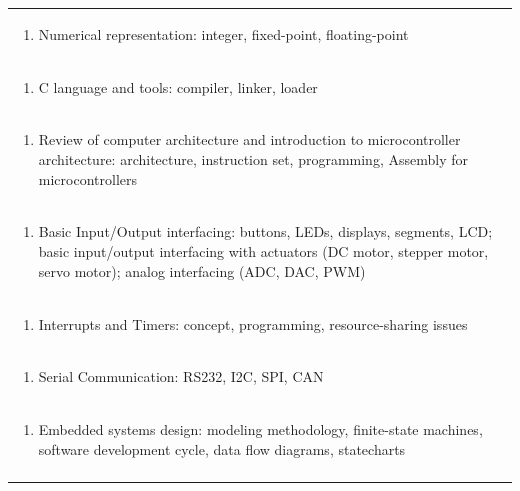 \documentclass[11pt]{article}
\begin{document}
\begin{center}
\begin{longtable}{|p{4cm}|p{4cm}|p{4cm}|p{4cm}|}
\multicolumn{4}{|p{\dimexpr 16cm + 6\tabcolsep\relax}|}{\begin{enumerate}[start=2]\item Numerical representation: integer, fixed-point, floating-point\end{enumerate}}\\
\multicolumn{4}{|p{\dimexpr 16cm + 6\tabcolsep\relax}|}{\begin{enumerate}[start=3]\item C language and tools: compiler, linker, loader\end{enumerate}}\\
\multicolumn{4}{|p{\dimexpr 16cm + 6\tabcolsep\relax}|}{\begin{enumerate}[start=4]\item Review of computer architecture and introduction to microcontroller architecture: architecture, instruction set, programming, Assembly for microcontrollers\end{enumerate}}\\
\multicolumn{4}{|p{\dimexpr 16cm + 6\tabcolsep\relax}|}{\begin{enumerate}[start=5]\item Basic Input/Output interfacing: buttons, LEDs, displays, segments, LCD; basic input/output interfacing with actuators (DC motor, stepper motor, servo motor); analog interfacing (ADC, DAC, PWM)\end{enumerate}}\\
\multicolumn{4}{|p{\dimexpr 16cm + 6\tabcolsep\relax}|}{\begin{enumerate}[start=6]\item Interrupts and Timers: concept, programming, resource-sharing issues\end{enumerate}}\\
\multicolumn{4}{|p{\dimexpr 16cm + 6\tabcolsep\relax}|}{\begin{enumerate}[start=7]\item Serial Communication: RS232, I2C, SPI, CAN\end{enumerate}}\\
\multicolumn{4}{|p{\dimexpr 16cm + 6\tabcolsep\relax}|}{\begin{enumerate}[start=8]\item Embedded systems design: modeling methodology, finite-state machines, software development cycle, data flow diagrams, statecharts\end{enumerate}}\\
\multicolumn{4}{|p{\dimexpr 16cm + 6\tabcolsep\relax}|}{}\\

\end{longtable}
\end{center}
\end{document}
